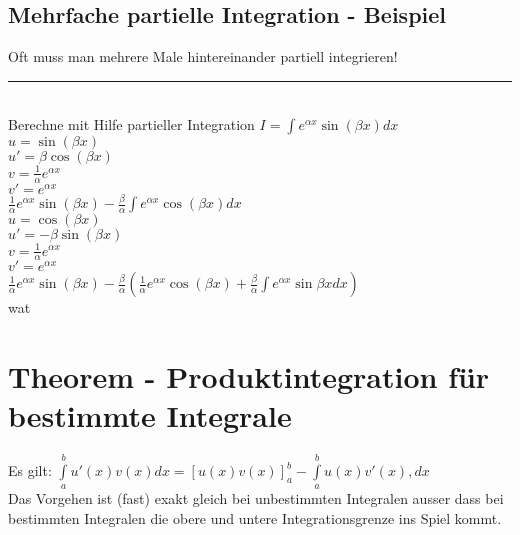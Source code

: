 \documentclass[../main.tex]{subfiles}
\begin{document}
\subsection{Mehrfache partielle Integration - Beispiel}
Oft muss man mehrere Male hintereinander partiell integrieren! \\
\noindent\rule{8cm}{0.4pt} \\
Berechne mit Hilfe partieller Integration $I=\int e^{\alpha x}\sin(\beta x)dx$ \\
$u=\sin(\beta x)$ \\
$u'=\beta \cos(\beta x)$ \\
$v=\frac{1}{\alpha}e^{\alpha x}$ \\
$v'=e^{\alpha x}$ \\
$ \frac{1}{\alpha}e^{\alpha x}\sin(\beta x) - \frac{\beta}{\alpha}\int e^{\alpha x}\cos(\beta x)dx $ \\
$u=\cos(\beta x)$ \\
$u'=-\beta \sin(\beta x)$ \\
$v=\frac{1}{\alpha}e^{\alpha x}$ \\
$v'=e^{\alpha x}$ \\
$ \frac{1}{\alpha}e^{\alpha x}\sin(\beta x) - \frac{\beta}{\alpha}(\frac{1}{\alpha}e^{\alpha x}\cos(\beta x)+\frac{\beta}{\alpha}\int e^{\alpha x}\sin\beta x dx)$ \\
wat

\section{Theorem - Produktintegration für bestimmte Integrale}
Es gilt: $\int\limits_a^b u'(x)v(x)dx = \left[ u(x)v(x)\right]_a^b - \int\limits_a^b u(x)v'(x),dx$ \\
Das Vorgehen ist (fast) exakt gleich bei unbestimmten Integralen ausser dass bei bestimmten
Integralen die obere und untere Integrationsgrenze ins Spiel kommt.
\end{document}
